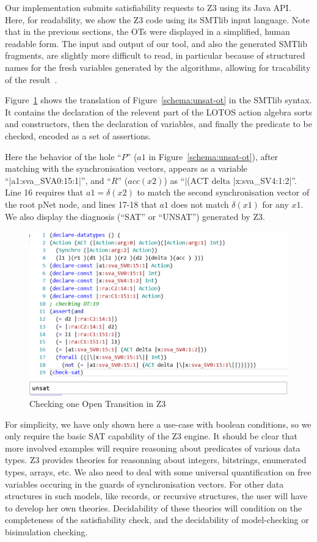 \documentclass[smallcondensed]{svjour3}
\begin{document}
Our implementation submits satisfiability requests to
Z3 using its Java API. Here, for readability, we
show the Z3 code using its SMTlib input language.
Note that in the previous sections, the OTs were displayed in a
simplified, human readable form. The input and output of our tool, and
also the generated SMTlib fragments, are
slightly more difficult to read, in 
particular because of structured names for the fresh variables generated
by the algorithms, allowing for tracability of the result~\cite{Avocs-RR}.

Figure~\ref{schema:smt-lib} shows the translation of  Figure~\ref{schema:unsat-ot}
in the SMTlib syntax. It contains the declaration
of the relevent part of the LOTOS action algebra sorts 
and constructors, then the declaration of variables, and finally the
predicate to be checked, encoded as a set of assertions.

Here the behavior of the hole ``$P$'' ($a1$ in Figure~\ref{schema:unsat-ot}), after matching with the synchronisation vectors, appears as a variable
``|a1:sva\_SVA0:15:1|'', and ``$R$'' ($acc(x2)$) as ``|(ACT delta
|x:sva\_SV4:1:2|''. Line 16 requires that $a1 = \delta(x2)$ to match
the second synchronisation vector of the root pNet node, and lines
17-18 that $a1$ does not match $\delta(x1)$ for any $x1$. 
We also display  the diagnosis (``SAT'' or ``UNSAT'') generated by Z3.

\begin{figure}[t]
    \centerline{\includegraphics[width=0.8\linewidth]{ActaXFIG/rise4fun1}}
  \caption{Checking one Open Transition in Z3}  \label{schema:smt-lib}
\end{figure}

For simplicity, we have only shown here a use-case with boolean conditions, so we only require the basic SAT capability of the Z3
engine. It should be clear that more involved examples will require
reasoning about predicates of various data types. Z3 provides theories for reasonning
about integers, bitstrings, enumerated types, arrays, etc.
We also need to deal with some universal quantification on free
variables occuring in the guards of synchronisation vectors.
For other data structures  in such models, like records, or
recursive structures, the user will have to develop her own theories.
Decidability of these theories will condition on the completeness of the
satisfiability check, and the decidability of model-checking or
bisimulation checking.
\end{document}
